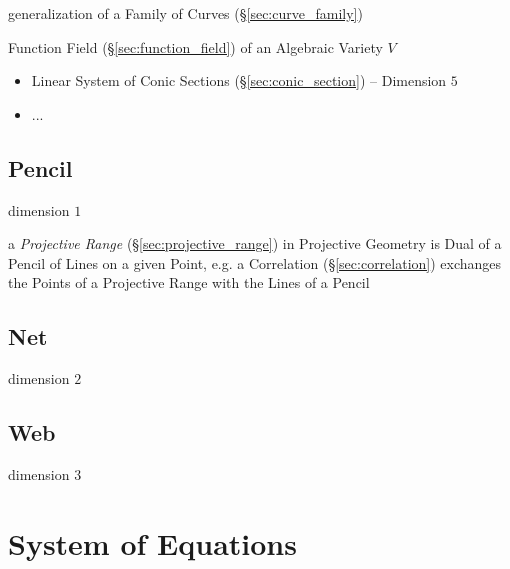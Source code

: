 generalization of a Family of Curves (\S\ref{sec:curve_family})

Function Field (\S\ref{sec:function_field}) of an Algebraic Variety $V$

\begin{itemize}
  \item Linear System of Conic Sections (\S\ref{sec:conic_section}) --
    Dimension $5$
  \item ...
\end{itemize}



\subsection{Pencil}\label{sec:pencil}

dimension $1$

\fist a \emph{Projective Range} (\S\ref{sec:projective_range}) in Projective
Geometry is Dual of a Pencil of Lines on a given Point, e.g. a Correlation
(\S\ref{sec:correlation}) exchanges the Points of a Projective Range with the
Lines of a Pencil



\subsection{Net}\label{sec:linear_divisor_net}

dimension $2$




\subsection{Web}\label{sec:web}

dimension $3$



\section{System of Equations}\label{sec:equation_system}

